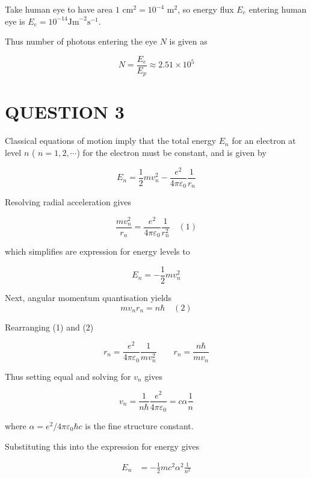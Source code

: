 \documentclass[a4paper]{article}
\begin{document}
Take human eye to have area $ 1 \text{ cm}^{2} = 10^{-4} \text{ m}^{2}$, so energy flux $ E_{e} $ entering human eye is  $ E_{e} = 10^{-14} \text{Jm}^{-2}\text{s}^{-1} $.

Thus number of photons entering the eye $ N $ is given as

\[ N = \frac{E_{e}}{E_{p}} \approx 2.51 \times 10^{5}  \]





\section{QUESTION 3}

Classical equations of motion imply that the total energy $ E_{n} $ for an electron at level $ n $ ( $ n = 1,2,\cdots $) for the electron must be constant, and is given by

\[ E_{n} = \frac{1}{2} m v_{n}^{2} - \frac{e^{2}}{4 \pi \varepsilon_{0}} \frac{1}{r_{n}} \]

Resolving radial acceleration gives

\[ \frac{m v_{n}^{2}}{r_{n}}  =  \frac{e^{2}}{4 \pi \varepsilon_{0}} \frac{1}{r_{n}^{2}} \quad (1) \]

which simplifies are expression for energy levels to 

\[ E_{n} = - \frac{1}{2} m v_{n}^{2} \]

Next, angular momentum quantisation yields 
\[ m v_{n} r_{n} = n\hbar \quad (2) \]

Rearranging (1) and (2)

\[ r_{n} = \frac{e^{2}}{4 \pi \varepsilon_{0}} \frac{1}{m v_{n}^{2}} \qquad r_{n} = \frac{n \hbar}{m v_{n}} \]

Thus setting equal and solving for $ v_{n} $ gives

\[ v_{n} = \frac{1}{n \hbar } \frac{e^{2}}{4 \pi \varepsilon_{0}} = c \alpha \frac{1}{n} \]

where $ \alpha = e^{2} / 4 \pi \varepsilon_{0} \hbar c $ is the fine structure constant. 


Substituting this into the expression for energy gives

\begin{align*}
 E_{n} & = - \frac{1}{2} m c^{2} \alpha^{2} \frac{1}{n^{2}}
\end{align*}
\end{document}

